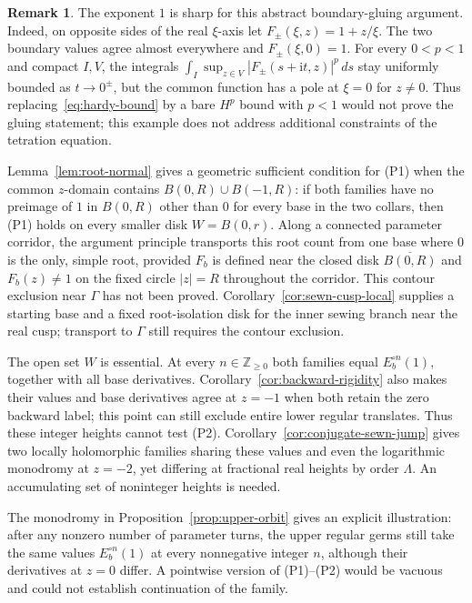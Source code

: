 \documentclass[11pt]{amsart}
\theoremstyle{definition}
\newtheorem{remark}[theorem]{Remark}
\newcommand{\ii}{\mathrm{i}}
\begin{document}
\begin{remark}
The exponent $1$ is sharp for this abstract boundary-gluing argument.
Indeed, on opposite sides of the real $\xi$-axis let
$F_\pm(\xi,z)=1+z/\xi$.  The two boundary values agree almost
everywhere and $F_\pm(\xi,0)=1$.  For every $0<p<1$ and compact
$I,V$, the integrals
$\int_I\sup_{z\in V}|F_\pm(s+\ii t,z)|^p\,ds$ stay uniformly bounded
as $t\to0^\pm$, but the common function has a pole at $\xi=0$ for
$z\ne0$.  Thus replacing~\eqref{eq:hardy-bound} by a bare $H^p$
bound with $p<1$ would not prove the gluing statement; this example
does not address additional constraints of the tetration equation.
\end{remark}

Lemma~\ref{lem:root-normal} gives a geometric sufficient condition for (P1)
when the common $z$-domain contains $B(0,R)\cup B(-1,R)$: if both families
have no preimage of $1$ in $B(0,R)$ other than $0$ for every base in
the two collars, then (P1) holds on every smaller disk $W=B(0,r)$.
Along a connected parameter corridor, the argument principle transports
this root count from one base where $0$ is the only, simple root, provided
$F_b$ is defined near the closed disk $\overline{B(0,R)}$ and
$F_b(z)\ne1$ on the fixed circle $|z|=R$ throughout the corridor.
This contour exclusion near $\Gamma$ has not been proved.
Corollary~\ref{cor:sewn-cusp-local} supplies a starting base and a fixed
root-isolation disk for the inner sewing branch near the real cusp;
transport to $\Gamma$ still requires the contour exclusion.

The open set $W$ is essential.  At every $n\in\mathbb Z_{\ge0}$ both
families equal $E_b^{\circ n}(1)$, together with all base derivatives.
Corollary~\ref{cor:backward-rigidity} also makes their values and base
derivatives agree at $z=-1$ when both retain the zero backward label;
this point can still exclude entire lower regular translates.  Thus
these integer heights cannot test (P2).
Corollary~\ref{cor:conjugate-sewn-jump} gives two locally holomorphic
families sharing these values and even the logarithmic monodromy at
$z=-2$, yet differing at fractional real heights by order $\Lambda$.
An accumulating set of noninteger heights
is needed.

The monodromy in Proposition~\ref{prop:upper-orbit} gives an
explicit illustration: after any nonzero number of parameter turns, the upper
regular germs still take the same values $E_b^{\circ n}(1)$ at every
nonnegative integer $n$, although their derivatives at $z=0$ differ.
A pointwise version of (P1)--(P2) would be vacuous and could not
establish continuation of the family.
\end{document}
